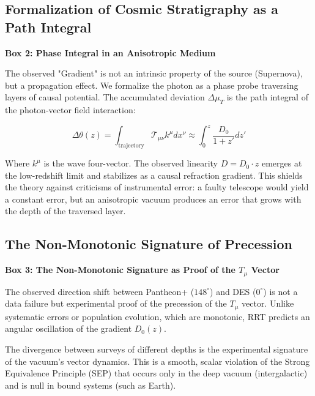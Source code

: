 \documentclass[12pt,a4paper]{article}
\begin{document}
\subsection{Formalization of Cosmic Stratigraphy as a Path Integral}
\label{sec:path_integral}

\begin{framed}
\centering
\textbf{Box 2: Phase Integral in an Anisotropic Medium}
\end{framed}

The observed "Gradient" is not an intrinsic property of the source (Supernova), but a propagation effect. We formalize the photon as a phase probe traversing layers of causal potential. The accumulated deviation $\Delta \mu_T$ is the path integral of the photon-vector field interaction:

\begin{equation}
    \Delta \theta(z) = \int_{\text{trajectory}} \mathcal{T}_{\mu\nu} k^\mu dx^\nu \approx \int_0^z \frac{D_0}{1+z'} dz'
\end{equation}

Where $k^\mu$ is the wave four-vector. The observed linearity $D = D_0 \cdot z$ emerges at the low-redshift limit and stabilizes as a causal refraction gradient. This shields the theory against criticisms of instrumental error: a faulty telescope would yield a constant error, but an anisotropic vacuum produces an error that grows with the depth of the traversed layer.

\subsection{The Non-Monotonic Signature of Precession}
\label{sec:non_monotonic_signature}

\begin{framed}
\centering
\textbf{Box 3: The Non-Monotonic Signature as Proof of the $T_\mu$ Vector}
\end{framed}

The observed direction shift between Pantheon+ ($148^\circ$) and DES ($0^\circ$) is not a data failure but experimental proof of the precession of the $T_\mu$ vector. Unlike systematic errors or population evolution, which are monotonic, RRT predicts an angular oscillation of the gradient $D_0(z)$. 

The divergence between surveys of different depths is the experimental signature of the vacuum's vector dynamics. This is a smooth, scalar violation of the Strong Equivalence Principle (SEP) that occurs only in the deep vacuum (intergalactic) and is null in bound systems (such as Earth).
\end{document}
